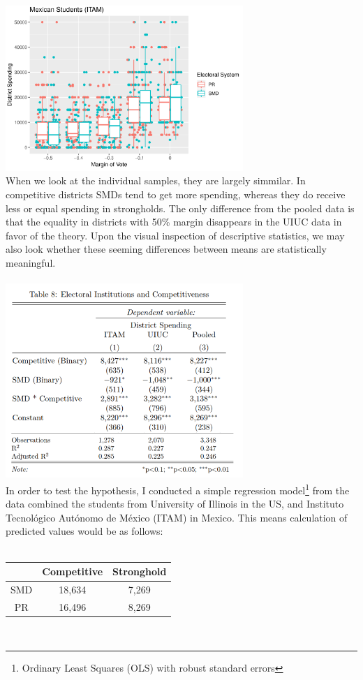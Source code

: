 \documentclass{article}
\begin{document}
\includegraphics[width=90mm]{Boxplot_ITAM}\\
When we look at the individual samples, they are largely simmilar. In competitive districts SMDs tend to get more spending, whereas they do receive less or equal spending in strongholds. The only difference from the pooled data is that the equality in districts with 50\% margin disappears in the UIUC data in favor of the theory. Upon the visual inspection of descriptive statistics, we may also look whether these seeming differences between means are statistically meaningful. \\
\\
\includegraphics[width=90mm]{Regressions_All}\\
In order to test the hypothesis, I conducted a simple regression model\footnote{Ordinary Least Squares (OLS) with robust standard errors} from the data combined the students from University of Illinois in the US, and Instituto Tecnol\'{o}gico Aut\'{o}nomo de M\'{e}xico (ITAM) in Mexico. This means calculation of predicted values would be as follows:\\
\\
\begin{left}
	\begin{tabular}{ |c|c|c| } 
		\hline
		 & Competitive & Stronghold \\ 
		\hline
		SMD & 18,634 & 7,269 \\ 
		\hline
		PR & 16,496 & 8,269 \\ 
		\hline
	\end{tabular}
\end{left}\\
\end{document}
